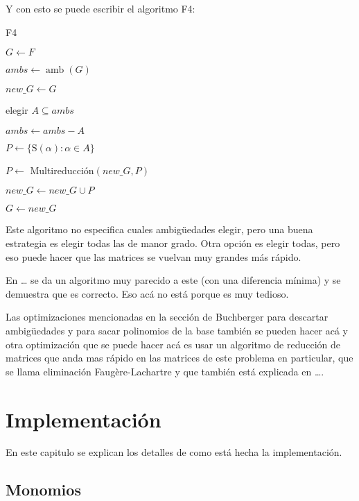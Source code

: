 \documentclass{report}
\theoremstyle{customstyle}
\theoremstyle{factstyle}
\DeclareMathOperator{\amb}{amb}
\renewcommand{\S}{\text{S}}
\begin{document}
Y con esto se puede escribir el algoritmo F4:

\begin{algorithm}[H] %
  \caption{F4}\label{alg:F4}
  $G ← F$

  \Loop{} {
    $ambs ← \amb(G)$

    $new\_G ← G$

     {
      elegir $Α ⊆ ambs$

      $ambs ← ambs - Α$

      $P ← \{\S(α) : α ∈ Α\}$

      $P ←$ Multireducción$(new\_G, P)$

      $new\_G ← new\_G ∪ P$
    }

     {
      \Break
    }

    $G ← new\_G$
  }

\end{algorithm}

Este algoritmo no especifica cuales ambigüedades elegir, pero una buena estrategia es elegir todas las de manor grado. Otra opción es elegir todas, pero eso puede hacer que las matrices se vuelvan muy grandes más rápido.

En … %
se da un algoritmo muy parecido a este (con una diferencia mínima) y se demuestra que es correcto. Eso acá no está porque es muy tedioso.

Las optimizaciones mencionadas en la sección de Buchberger para descartar ambigüedades y para sacar polinomios de la base también se pueden hacer acá y otra optimización que se puede hacer acá es usar un algoritmo de reducción de matrices que anda mas rápido en las matrices de este problema en particular,  que se llama eliminación Faugère-Lachartre y que también está explicada en …. %


\chapter{Implementación}

En este capitulo se explican los detalles de como está hecha la implementación.

\section{Monomios}
\end{document}
